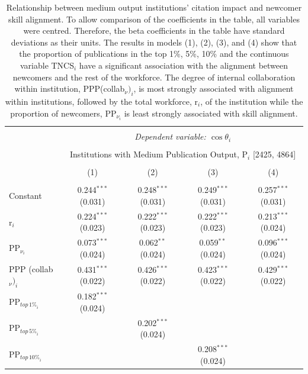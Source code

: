 \documentclass[draft,final]{vutinfth} %
\begin{document}
\begin{table}[!htbp] \centering 
  \caption{Relationship between medium output institutions' citation impact and newcomer skill alignment. To allow comparison of the coefficients in the table, all variables were centred. Therefore, the beta coefficients in the table have standard deviations as their units. The results in models (1), (2), (3), and (4) show that the proportion of publications in the top 1\%, 5\%, 10\% and the continuous variable TNCS$_{i}$ have a significant association with the alignment between newcomers and the rest of the workforce. The degree of internal collaboration within institution, PPP(collab$_{\nu})_{i}$, is most strongly associated with alignment within institutions, followed by the total workforce, r$_{i}$, of the institution while the proportion of newcomers, PP$_{\nu_i}$ is least strongly associated with skill alignment.} 
  \label{Table S3} 
\small 
\scriptsize
\begin{tabularx}{\textwidth}{@{\extracolsep{\fill}}lcccc}
\hline \\[-1.8ex] 
 & \multicolumn{4}{c}{\textit{Dependent variable: $\cos{\theta}_{i}$}} \\ 
\cline{2-5} 
\\[-1.8ex] & \multicolumn{4}{c}{Institutions with Medium Publication Output, P$_{i}$ [2425, 4864]} \\ 
\\[-1.8ex] & (1) & (2) & (3) & (4)\\ 
\hline \\[-1.8ex] 
 Constant & 0.244$^{***}$ (0.031) & 0.248$^{***}$ (0.031) & 0.249$^{***}$ (0.031) & 0.257$^{***}$ (0.031) \\ 
  r$_{i}$ & 0.224$^{***}$ (0.023) & 0.222$^{***}$ (0.023) & 0.222$^{***}$ (0.023) & 0.213$^{***}$ (0.024) \\ 
  PP$_{\nu_i}$ & 0.073$^{***}$ (0.024) & 0.062$^{**}$ (0.024) & 0.059$^{**}$ (0.024) & 0.096$^{***}$ (0.024) \\ 
  PPP (collab$_\nu)_{i}$ & 0.431$^{***}$ (0.022) & 0.426$^{***}$ (0.022) & 0.423$^{***}$ (0.022) & 0.429$^{***}$ (0.022) \\ 
  PP$_{{top\,1\%}_{i}}$ & 0.182$^{***}$ (0.024) &  &  &  \\ 
  PP$_{{top\,5\%}_{i}}$ &  & 0.202$^{***}$ (0.024) &  &  \\ 
  PP$_{{top\,10\%}_{i}}$ &  &  & 0.208$^{***}$ (0.024) &  \\ 

\end{tabularx}
\end{table}
\end{document}
